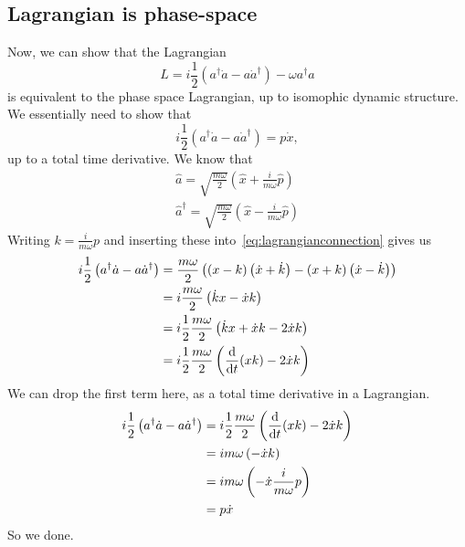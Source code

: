 \documentclass{article}
\begin{document}
	\subsection{Lagrangian is phase-space} \label{subsec:lagrangianphasespace}
	Now, we can show that the Lagrangian
	\begin{equation}
		L = i\frac12 \left(a^\dagger \dot{a} - a \dot{a}^\dagger \right) - \omega a^\dagger a
	\end{equation}
	is equivalent to the phase space Lagrangian, up to isomophic dynamic structure.
	We essentially need to show that
	\begin{equation}
		i\frac12 \left(a^\dagger \dot{a} - a \dot{a}^\dagger \right) = p \dot{x}, \label{eq:lagrangianconnection}
	\end{equation}
	up to a total time derivative.
	We know that
	\begin{align}
		\hat{a} = \sqrt{\frac{m \omega}{2}} \left(\hat{x} + \frac{i}{m \omega} \hat{p} \right) \\
		\hat{a}^\dagger = \sqrt{\frac{m \omega}{2}} \left(\hat{x} - \frac{i}{m \omega} \hat{p} \right)
	\end{align}
	Writing $k = \frac{i}{m \omega} p$ and inserting these into~\eqref{eq:lagrangianconnection} gives us
	\begin{align}
		i\frac12 \left(a^\dagger \dot{a} - a \dot{a}^\dagger \right) &= \frac{m \omega}{2} \left( \left( x - k \right)\left(\dot{x} + \dot{k} \right) - \left(x + k \right) \left(\dot{x} - \dot{k} \right)\right) \\
		&= i  \frac{m \omega}{2} \left( \dot{k} x - \dot{x} k \right) \\
		&= i \frac12 \frac{m \omega}{2} \left( \dot{k} x + \dot{x} k - 2 \dot{x} k \right) \\
		&= i \frac12 \frac{m \omega}{2} \left( \dv{t}(xk) - 2 \dot{x} k \right)
	\end{align}
	We can drop the first term here, as a total time derivative in a Lagrangian.
	\begin{align}
		i\frac12 \left(a^\dagger \dot{a} - a \dot{a}^\dagger \right) &= i \frac12 \frac{m \omega}{2} \left( \dv{t}(xk) - 2 \dot{x} k \right) \\
		&= i m \omega \left( - \dot{x} k \right) \\
		&= i m \omega \left( - \dot{x} \frac{i}{m \omega} p \right) \\
		&= p \dot{x}
	\end{align}
	So we done.

	\newpage
	\listoftodos
\end{document}
